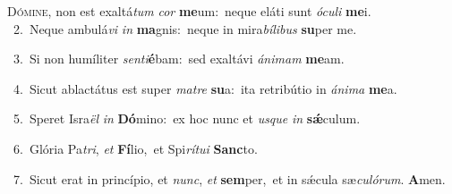 \lettrine{\initial\textcolor{\initialcolor}{D}}{ómine,} non est exaltá\textit{tum} \textit{cor} \textbf{me}\-um:~\star neque eláti sunt \textit{ó}\-\textit{cu}\textit{li} \textbf{me}\-i.\\
{\numbfont\textcolor{\numbcolor}{~2.}}~Neque ambulá\textit{vi} \textit{in} \textbf{ma}\-gnis:~\star neque in mira\-\textit{bí}\-\textit{li}\textit{bus} \textbf{su}\-per me.\par
{\numbfont\textcolor{\numbcolor}{~3.}}~Si non humíliter \textit{sen}\-\textit{ti}\textbf{é}bam:~\star sed exaltávi \textit{á}\-\textit{ni}\textit{mam} \textbf{me}\-am.\par
{\numbfont\textcolor{\numbcolor}{~4.}}~Sicut ablactátus est super \textit{ma}\-\textit{tre} \textbf{su}\-a:~\star ita retribútio in \textit{á}\-\textit{ni}\textit{ma} \textbf{me}\-a.\par
{\numbfont\textcolor{\numbcolor}{~5.}}~Speret Isra\textit{ël} \textit{in} \textbf{Dó}\-mino:~\star ex hoc nunc et \textit{us}\-\textit{que} \textit{in} \textbf{sǽ}\-culum.\par
{\numbfont\textcolor{\numbcolor}{~6.}}~Glória Pa\-\textit{tri}\-, \textit{et} \textbf{Fí}\-lio,~\star et Spi\-\textit{rí}\-\textit{tu}\textit{i} \textbf{Sanc}\-to.\par
{\numbfont\textcolor{\numbcolor}{~7.}}~Sicut erat in princípio, et \textit{nunc}\-, \textit{et} \textbf{sem}\-per,~\star et in sǽcula sæ\-\textit{cu}\-\textit{ló}\textit{rum}. \textbf{A}\-men.\par
